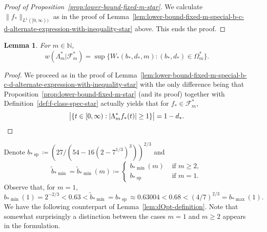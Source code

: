 \documentclass[a4paper]{amsart} %
\newtheorem{lemma}[theorem]{Lemma}
\theoremstyle{definition}
\theoremstyle{remark}
\numberwithin{equation}{section}
\newcommand*{\NNone}{\mathbb{N}}
\newcommand*{\weakconstrestricted}[2]{w(#1|#2)} %
\newcommand*{\fclassspecStar}[1]{\mathcal{F}_{#1}^*}
\newcommand*{\fStar}{f_{*}}
\newcommand*{\bStar}{b_*}
\newcommand*{\dStar}{d_*}
\newcommand*{\specialbdStar}[1]{\Omega_{#1}^*}
\newcommand*{\XXXspecialbdStar}{W_*}
\newcommand*{\bMinStar}{b_{*\!\min}}
\newcommand*{\bMaxStar}{b_{*\!\max}}
\newcommand*{\bShStar}{b_{*\!\operatorname{sp}}}
\newcommand*{\bMinTildeStar}{\widetilde{b}_{*\!\min}}
\begin{document}
\begin{proof}[Proof of Proposition~\ref{prop:lower-bound-fixed-m-star}]
	
	We calculate 
	$\|\fStar\|_{L^1([0, \infty))}$ as in the proof of Lemma~\ref{lem:lower-bound-fixed-m-special-b-c-d-alternate-expression-with-inequality-star} above.
	This ends the proof.
\end{proof}


\begin{lemma}
	\label{lem:lower-bound-fixed-m-special-b-c-d-alternate-expression-star}
	For $m\in\NNone$,
	\begin{equation*}
	\weakconstrestricted{\Lambda_m^*}{\fclassspecStar{m}} 
	=  
	\sup\bigl\{
	\XXXspecialbdStar(\bStar,\dStar,m) : (\bStar,\dStar)\in\specialbdStar{m} \bigr\}.
	\end{equation*}
\end{lemma}

\begin{proof}
	We proceed as in the proof of Lemma~\ref{lem:lower-bound-fixed-m-special-b-c-d-alternate-expression-with-inequality-star}
	with the only difference being that 
	Proposition~\ref{prop:lower-bound-fixed-m-star} (and its proof)
	together with 	Definition~\ref{def:f-class-spec-star} actually yields
	that for $\fStar\in\fclassspecStar{m}$,
	\begin{equation*}
	\bigl|\{t\in[0,\infty) : |\Lambda_m^* \fStar(t)|\geq 1\} \bigr| = 1 - \dStar.
	\qedhere
	\end{equation*}
\end{proof}


Denote 
$\bShStar \coloneqq (27/(54 - 16(2-7^{1/3})^3))^{2/3}$ and
\begin{equation}
\label{eq:def-bMinTildeStar}
\bMinTildeStar = \bMinTildeStar(m)
\coloneqq
\begin{cases}
\bMinStar(m) & \text{ if } m\geq 2,\\
\bShStar & \text{ if } m = 1.
\end{cases}
\end{equation}
Observe that, for $m=1$,
\[
\bMinStar(1) = 2^{-2/3}
< 0.63 <
\bMinTildeStar = \bShStar \approx 0.63004
< 0.68 <
(4/7)^{2/3}
=
\bMaxStar(1).
\]
We have the following counterpart of Lemma~\ref{lem:dOpt-definition}.
Note that somewhat surprisingly a distinction between the cases $m=1$ and $m\geq 2$ appears
in the formulation.
\end{document}
